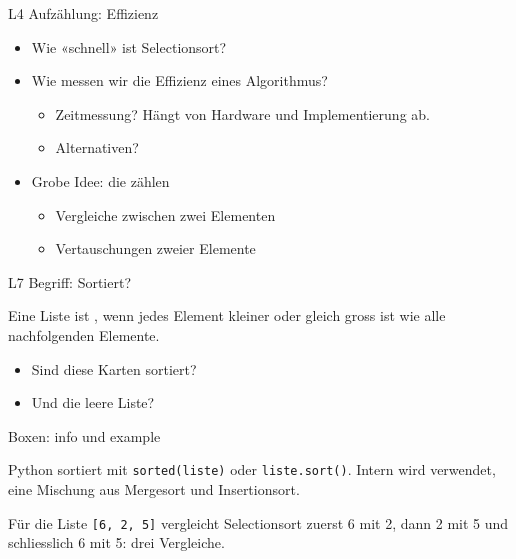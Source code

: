 \documentclass[aspectratio=169,12pt,xcolor={dvipsnames}]{beamer}
\begin{document}
\begin{frame}{L4 Aufzählung: Effizienz}
  \begin{itemize}
    \item Wie «schnell» ist Selectionsort?
    \item Wie messen wir die Effizienz eines Algorithmus?
    \begin{itemize}
      \item Zeitmessung? Hängt von Hardware und Implementierung ab.
      \item Alternativen?
    \end{itemize}
    \item<2-> Grobe Idee: die  zählen
    \begin{itemize}
      \item<2-> Vergleiche zwischen zwei Elementen
      \item<2-> Vertauschungen zweier Elemente
    \end{itemize}
  \end{itemize}
\end{frame}

\begin{frame}{L7 Begriff: Sortiert?}
  \begin{concept}
    Eine Liste ist , wenn jedes Element kleiner oder gleich gross ist
    wie alle nachfolgenden Elemente.
  \end{concept}
  \begin{itemize}
    \item Sind diese Karten sortiert?
    \item Und die leere Liste?
  \end{itemize}
\end{frame}

\begin{frame}{Boxen: info und example}
  \begin{info}
    Python sortiert mit \texttt{sorted(liste)} oder \texttt{liste.sort()}. Intern wird
     verwendet, eine Mischung aus Mergesort und Insertionsort.
  \end{info}
  \begin{example}
    Für die Liste \texttt{[6, 2, 5]} vergleicht Selectionsort zuerst 6 mit 2, dann 2 mit 5
    und schliesslich 6 mit 5: drei Vergleiche.
  \end{example}
\end{frame}
\end{document}
